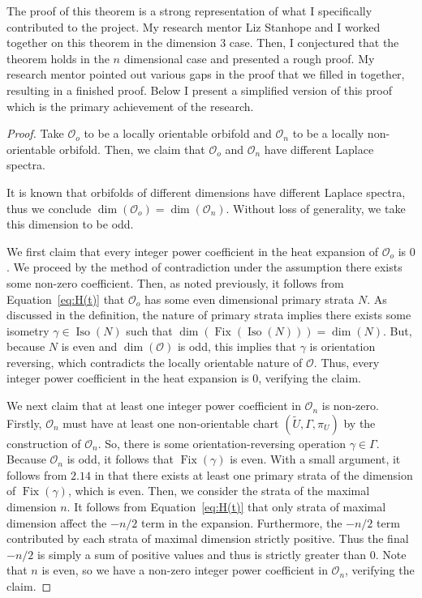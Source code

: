 \documentclass{article}[12pt]
\theoremstyle{definition}
\newcommand{\orb}{\mathcal{O}}
\DeclareMathOperator{\iso}{Iso}
\DeclareMathOperator{\fix}{Fix}
\begin{document}
The proof of this theorem is a strong representation of what I specifically
contributed to the project. My research mentor Liz Stanhope and I worked
together on this theorem in the dimension $3$ case. Then, I conjectured
that the theorem holds in the $n$ dimensional case and presented a rough
proof. My research mentor pointed out various gaps in the proof that we
filled in together, resulting in a finished proof. Below I present a
simplified version of this proof which is the primary achievement of the
research.

\begin{proof}

Take $\mathcal{O}_o$ to be a locally orientable orbifold and
$\mathcal{O}_n$ to be a locally non-orientable orbifold. Then, we claim
that $\mathcal{O}_o$ and $\mathcal{O}_n$ have different Laplace spectra. 

It is known that orbifolds of different dimensions have different Laplace
spectra, thus we conclude $\dim(\orb_o) =
\dim(\orb_n)$. Without loss of generality, we take this dimension to be
odd.

We first claim that every integer power coefficient in the heat expansion of
$\mathcal{O}_o$ is $0$. We proceed by the method of contradiction under the
assumption there exists some non-zero coefficient.  Then, as noted
previously, it follows from Equation~\ref{eq:H(t)} that $\orb_o$ has some
even dimensional primary strata $N$. As discussed in the definition, the nature of
primary strata implies there exists some isometry $\gamma \in \iso(N)$ such
that $\dim(\fix(\iso(N))) = \dim(N)$. But, because $N$ is even and
$\dim(\orb)$ is odd, this implies that $\gamma$ is orientation reversing,
which contradicts the locally orientable nature of $\orb$. Thus, every
integer power coefficient in the heat expansion is $0$, verifying the
claim.

We next claim that at least one integer power coefficient in $\orb_n$ is
non-zero. Firstly, $\orb_n$ must have at least one non-orientable chart
$(\widetilde{U}, \Gamma, \pi_U)$ by the construction of $\orb_n$. So, there
is some orientation-reversing operation $\gamma \in \Gamma$. Because
$\orb_n$ is odd, it follows that $\fix(\gamma)$ is even. With a small
argument, it follows from $2.14$ in \cite{DGGW} that there exists at least one primary
strata of the dimension of $\fix(\gamma)$, which is even.
Then, we consider the strata of the maximal dimension $n$. It follows from
Equation~\ref{eq:H(t)} that only strata of maximal dimension affect the
$-n/2$ term in the expansion. Furthermore, the $-n/2$ term contributed by
each strata of maximal dimension strictly positive. Thus the final $-n/2$
is simply a sum of positive values and thus is strictly greater than $0$.
Note that $n$ is even, so we have a non-zero integer power coefficient in
$\orb_n$, verifying the claim.


\end{proof}
\end{document}
